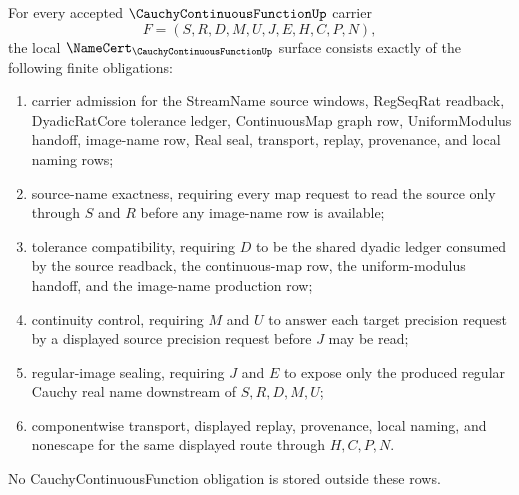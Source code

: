 \begin{theorem}
\label{thm:cauchy-continuous-function-namecert-obligations}
For every accepted $\CauchyContinuousFunctionUp$ carrier
$$
F=(S,R,D,M,U,J,E,H,C,P,N),
$$
the local $\NameCert_{\CauchyContinuousFunctionUp}$ surface consists exactly of the following finite obligations:
\begin{enumerate}
\item carrier admission for the StreamName source windows, RegSeqRat readback, DyadicRatCore tolerance ledger, ContinuousMap graph row, UniformModulus handoff, image-name row, Real seal, transport, replay, provenance, and local naming rows;
\item source-name exactness, requiring every map request to read the source only through $S$ and $R$ before any image-name row is available;
\item tolerance compatibility, requiring $D$ to be the shared dyadic ledger consumed by the source readback, the continuous-map row, the uniform-modulus handoff, and the image-name production row;
\item continuity control, requiring $M$ and $U$ to answer each target precision request by a displayed source precision request before $J$ may be read;
\item regular-image sealing, requiring $J$ and $E$ to expose only the produced regular Cauchy real name downstream of $S,R,D,M,U$;
\item componentwise transport, displayed replay, provenance, local naming, and nonescape for the same displayed route through $H,C,P,N$.
\end{enumerate}
No CauchyContinuousFunction obligation is stored outside these rows.
\end{theorem}
